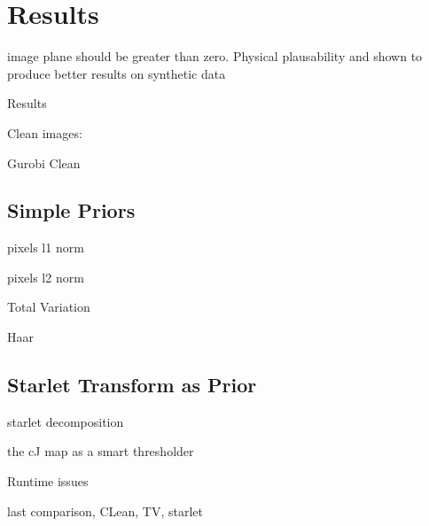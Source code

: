 \section{Results}

image plane should be greater than zero. Physical plausability and shown to produce better results on synthetic data \cite{mcewen2011compressed}


Results

Clean images:


Gurobi Clean


\subsection{Simple Priors}

pixels l1 norm

pixels l2 norm

Total Variation

Haar 

\subsection{Starlet Transform as Prior}

starlet decomposition

the cJ map as a smart thresholder

Runtime issues


last comparison, CLean, TV, starlet